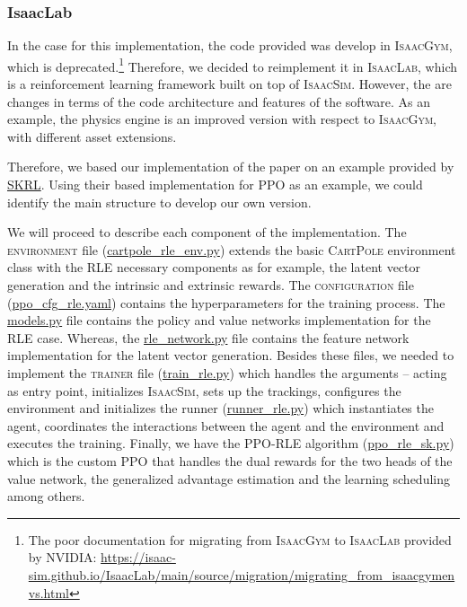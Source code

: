 \documentclass[10pt]{article} %
\begin{document}
\subsubsection{IsaacLab}
In the case for this implementation, the code provided was develop in \textsc{IsaacGym}, which is deprecated.\footnote{The poor documentation for migrating from \textsc{IsaacGym} to \textsc{IsaacLab} provided by NVIDIA: \url{https://isaac-sim.github.io/IsaacLab/main/source/migration/migrating_from_isaacgymenvs.html}} Therefore, we decided to reimplement it in \textsc{IsaacLab}, which is a reinforcement learning framework built on top of \textsc{IsaacSim}. However, the are changes in terms of the code architecture and features of the software. As an example, the physics engine is an improved version with respect to \textsc{IsaacGym}, with different asset extensions.

Therefore, we based our implementation of the paper on an example provided by \href{https://skrl.readthedocs.io/en/latest/#}{SKRL}. Using their based implementation for \textsc{PPO} as an example, we could identify the main structure to develop our own version. 

We will proceed to describe each component of the implementation. The \textsc{environment} file (\url{cartpole\_rle\_env.py}) extends the basic \textsc{CartPole} environment class with the \textsc{RLE} necessary components as for example, the latent vector generation and the intrinsic and extrinsic rewards. The \textsc{configuration} file (\url{ppo\_cfg\_rle.yaml}) contains the hyperparameters for the training process. The \url{models.py} file contains the policy and value networks implementation for the \textsc{RLE} case. Whereas, the \url{rle\_network.py} file contains the feature network implementation for the latent vector generation. Besides these files, we needed to implement the \textsc{trainer} file (\url{train\_rle.py}) which handles the arguments -- acting as entry point, initializes \textsc{IsaacSim}, sets up the trackings, configures the environment and initializes the runner (\url{runner\_rle.py}) which instantiates the agent, coordinates the interactions between the agent and the environment and executes the training. Finally, we have the \textsc{PPO}-\textsc{RLE} algorithm (\url{ppo\_rle\_sk.py}) which is the custom \textsc{PPO} that handles the dual rewards for the two heads of the value network, the generalized advantage estimation and the learning scheduling among others. 
\end{document}

